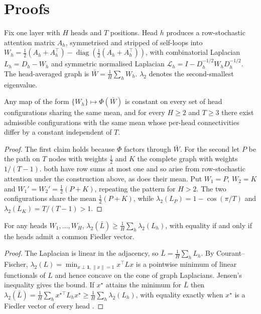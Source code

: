 \clearpage
{}
\makeatletter
\renewcommand*\l@section{\@dottedtocline{1}{0em}{2.0em}}
\renewcommand*\l@subsection{\@dottedtocline{2}{2.0em}{2.8em}}
\makeatother
\renewcommand{\contentsname}{Appendix contents}
{\small\setlength{\parskip}{0pt}\tableofcontents}
\medskip

\section{Proofs}
\label{app:proofs}

Fix one layer with $H$ heads and $T$ positions. Head $h$ produces a row-stochastic attention matrix $A_h$, symmetrised and stripped of self-loops into $W_h = \tfrac12(A_h + A_h^\top) - \operatorname{diag}(\tfrac12(A_h + A_h^\top))$, with combinatorial Laplacian $L_h = D_h - W_h$ and symmetric normalised Laplacian $\mathcal{L}_h = I - D_h^{-1/2} W_h D_h^{-1/2}$. The head-averaged graph is $\bar W = \frac1H \sum_h W_h$. $\lambda_2$ denotes the second-smallest eigenvalue.

\begin{proposition}[annihilation]
\label{prop:annihilation}
Any map of the form $\{W_h\} \mapsto \Phi(\bar W)$ is constant on every set of head configurations sharing the same mean, and for every $H \ge 2$ and $T \ge 3$ there exist admissible configurations with the same mean whose per-head connectivities differ by a constant independent of $T$.
\end{proposition}
\begin{proof}
The first claim holds because $\Phi$ factors through $\bar W$. For the second let $P$ be the path on $T$ nodes with weights $\tfrac12$ and $K$ the complete graph with weights $1/(T-1)$. both have row sums at most one and so arise from row-stochastic attention under the construction above, as does their mean. Put $W_1 = P$, $W_2 = K$ and $W_1' = W_2' = \tfrac12(P + K)$, repeating the pattern for $H > 2$. The two configurations share the mean $\tfrac12(P+K)$, while $\lambda_2(L_P) = 1 - \cos(\pi/T)$ and $\lambda_2(L_K) = T/(T-1) > 1$.
\end{proof}

\begin{proposition}
\label{prop:jensen}
For any heads $W_1, \dots, W_H$, $\lambda_2(\bar L) \ge \frac1H \sum_h \lambda_2(L_h)$, with equality if and only if the heads admit a common Fiedler vector.
\end{proposition}
\begin{proof}
The Laplacian is linear in the adjacency, so $\bar L = \frac1H \sum_h L_h$. By Courant--Fischer, $\lambda_2(L) = \min_{x \perp \mathbf 1, \|x\|=1} x^\top L x$ is a pointwise minimum of linear functionals of $L$ and hence concave on the cone of graph Laplacians. Jensen's inequality gives the bound. If $x^\star$ attains the minimum for $\bar L$ then $\lambda_2(\bar L) = \frac1H \sum_h x^{\star\top} L_h x^\star \ge \frac1H \sum_h \lambda_2(L_h)$, with equality exactly when $x^\star$ is a Fiedler vector of every head \citep{chung1997spectral}.
\end{proof}

